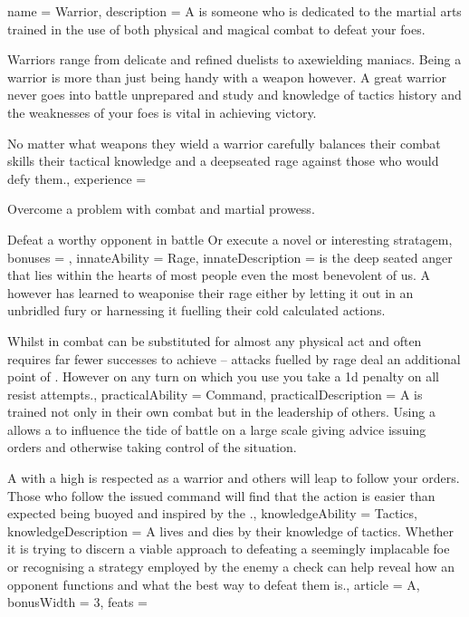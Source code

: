 \archetype
{
	name = Warrior,
	description = A \bname{} is someone who is dedicated to the martial arts\comma{} trained in the use of both physical and magical combat to defeat your foes. 

Warriors range from delicate and refined duelists\comma{} to axe\minus{}wielding maniacs. Being a warrior is more than just being handy with a weapon\comma{} however. A great warrior never goes into battle unprepared\comma{} and study and knowledge of tactics\comma{} history and the weaknesses of your foes is vital in achieving victory. 

No matter what weapons they wield\comma{} a warrior carefully balances their combat skills\comma{} their tactical knowledge and a deep\minus{}seated rage against those who would defy them.,
	experience = \item Overcome a problem with combat and martial prowess.
\item Defeat a worthy opponent in battle
Or execute a novel or interesting stratagem,
	bonuses = 
,
	innateAbility = Rage,
	innateDescription =  is the deep seated anger that lies within the hearts of most people\comma{} even the most benevolent of us. A \bname{}\comma{} however\comma{} has learned to weaponise their rage\comma{} either by letting it out in an unbridled fury\comma{} or harnessing it\comma{} fuelling their cold\comma{} calculated actions. 

Whilst in combat\comma{}  can be substituted for almost any physical act\comma{} and often requires far fewer successes to achieve – attacks fuelled by rage deal an additional point of . However\comma{} on any turn on which you use \comma{} you take a 1d penalty on all resist attempts.,
	practicalAbility = Command,
	practicalDescription = A \bname{} is trained not only in their own combat\comma{} but in the leadership of others. Using a  allows a \bname{} to influence the tide of battle on a large scale\comma{} giving advice\comma{} issuing orders and otherwise taking control of the situation. 

A \bname{} with a high  is respected as a warrior\comma{} and others will leap to follow your orders. Those who follow the issued command will find that the action is easier than expected\comma{} being buoyed and inspired by the .,
	knowledgeAbility = Tactics,
	knowledgeDescription = A \bname{} lives and dies by their knowledge of tactics. Whether it is trying to discern a viable approach to defeating a seemingly implacable foe\comma{} or recognising a strategy employed by the enemy\comma{} a  check can help reveal how an opponent functions\comma{} and what the best way to defeat them is.,
	article = A,
	bonusWidth = 3, feats = \WarriorFeats
}


